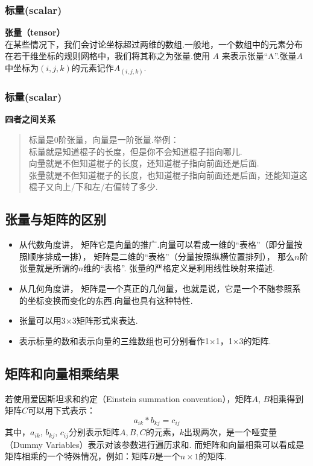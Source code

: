 \subsubsection{标量(scalar)}
\textbf{张量（tensor）}\\
​在某些情况下，我们会讨论坐标超过两维的数组.一般地，一个数组中的元素分布在若干维坐标的规则网格中，我们将其称之为张量.使用
\(A\)
来表示张量``A''.张量\(A\)中坐标为\((i,j,k)\)的元素记作\(A_{(i,j,k)}\).
\subsubsection{标量(scalar)}
\textbf{四者之间关系}

\begin{quote}
标量是0阶张量，向量是一阶张量.举例：\\
​标量就是知道棍子的长度，但是你不会知道棍子指向哪儿.\\
​向量就是不但知道棍子的长度，还知道棍子指向前面还是后面.\\
​张量就是不但知道棍子的长度，也知道棍子指向前面还是后面，还能知道这棍子又向上/下和左/右偏转了多少.
\end{quote}

\subsection{张量与矩阵的区别}\label{ux5f20ux91cfux4e0eux77e9ux9635ux7684ux533aux522b}

\begin{itemize}
\item
  从代数角度讲，
  矩阵它是向量的推广.向量可以看成一维的``表格''（即分量按照顺序排成一排），
  矩阵是二维的``表格''（分量按照纵横位置排列），
  那么\(n\)阶张量就是所谓的\(n\)维的``表格''.
  张量的严格定义是利用线性映射来描述.
\item
  从几何角度讲，
  矩阵是一个真正的几何量，也就是说，它是一个不随参照系的坐标变换而变化的东西.向量也具有这种特性.
\item
  张量可以用3×3矩阵形式来表达.
\item
  表示标量的数和表示向量的三维数组也可分别看作1×1，1×3的矩阵.
\end{itemize}

\subsection{矩阵和向量相乘结果}\label{ux77e9ux9635ux548cux5411ux91cfux76f8ux4e58ux7ed3ux679c}

若使用爱因斯坦求和约定（Einstein summation convention），矩阵\(A\),
\(B\)相乘得到矩阵\(C\)可以用下式表示：
\[ a_{ik}*b_{kj}=c_{ij} \tag{1.3-1} \] 其中，\(a_{ik}\), \(b_{kj}\),
\(c_{ij}\)分别表示矩阵\(A, B, C\)的元素，\(k\)出现两次，是一个哑变量（Dummy
Variables）表示对该参数进行遍历求和.
而矩阵和向量相乘可以看成是矩阵相乘的一个特殊情况，例如：矩阵\(B\)是一个\(n \times 1\)的矩阵.

